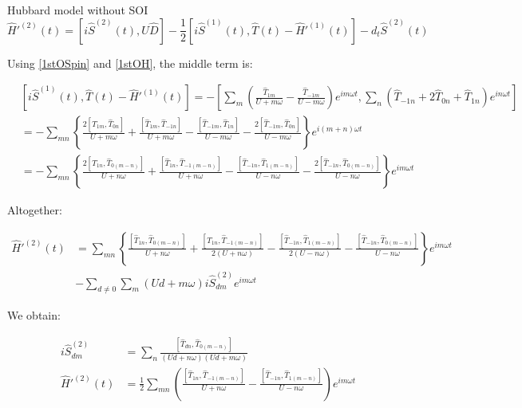 \begin{section}{Hubbard model without SOI}
\begin{equation}
\hat{H}'^{(2)}(t) = \left[i\hat{S}^{(2)}(t), U \hat{D} \right] - \frac{1}{2}\left[ i\hat{S}^{(1)}(t), \hat{T}(t) - \hat{H}'^{(1)}(t)\right] - d_t\hat{S}^{(2)}(t)
\end{equation}

Using \ref{1stOSpin} and \ref{1stOH}, the middle term is:

\begin{align*}
&\left[ i\hat{S}^{(1)}(t), \hat{T}(t) - \hat{H}'^{(1)}(t)\right] = -\left[\sum_m \left( \frac{\hat{T}_{1m}}{U+m\omega} - \frac{\hat{T}_{-1m}}{U-m\omega} \right)e^{im \omega t}, \sum_n \left( \hat{T}_{-1n} + 2\hat{T}_{0n} + \hat{T}_{1n} \right) e^{in\omega t} \right] \\
&= -\sum_{mn} \left\{ \frac{2\left[\hat{T}_{1m}, \hat{T}_{0n} \right]}{U+m\omega} + \frac{\left[\hat{T}_{1m}, \hat{T}_{-1n} \right]}{U+m\omega} - \frac{\left[\hat{T}_{-1m}, \hat{T}_{1n} \right]}{U-m\omega} - \frac{2\left[\hat{T}_{-1m}, \hat{T}_{0n} \right]}{U-m\omega} \right\} e^{i(m+n)\omega t} \\
&= -\sum_{mn} \left\{ \frac{2\left[\hat{T}_{1n}, \hat{T}_{0(m-n)} \right]}{U+n\omega} + \frac{\left[\hat{T}_{1n}, \hat{T}_{-1(m-n)} \right]}{U+n\omega} - \frac{\left[\hat{T}_{-1n}, \hat{T}_{1(m-n)} \right]}{U-n\omega} - \frac{2\left[\hat{T}_{-1n}, \hat{T}_{0(m-n)} \right]}{U-n\omega} \right\} e^{im\omega t}
\end{align*}

Altogether:

\begin{align*}
\hat{H}'^{(2)}(t) &= \sum_{mn} \left\{ \frac{\left[\hat{T}_{1n}, \hat{T}_{0(m-n)} \right]}{U+n\omega} + \frac{\left[\hat{T}_{1n}, \hat{T}_{-1(m-n)} \right]}{2(U+n\omega)} - \frac{\left[\hat{T}_{-1n}, \hat{T}_{1(m-n)} \right]}{2(U-n\omega)} - \frac{\left[\hat{T}_{-1n}, \hat{T}_{0(m-n)} \right]}{U-n\omega} \right\} e^{im\omega t} \\
&-\sum_{d\neq 0}\sum_m (Ud+m\omega) i\hat{S}^{(2)}_{dm} e^{im\omega t}
\end{align*}

We obtain:

\begin{align}
i\hat{S}^{(2)}_{dm} &= \sum_n \frac{\left[ \hat{T}_{dn}, \hat{T}_{0(m-n)} \right]}{(Ud+n\omega)(Ud+m\omega)} \label{2ndOSpin}\\
\hat{H}'^{(2)}(t) &= \frac{1}{2}\sum_{mn} \left( \frac{\left[\hat{T}_{1n}, \hat{T}_{-1(m-n)} \right]}{U+n\omega} - \frac{\left[\hat{T}_{-1n}, \hat{T}_{1(m-n)} \right]}{U-n\omega} \right) e^{im\omega t} \label{2ndOH}
\end{align}


\end{section}
